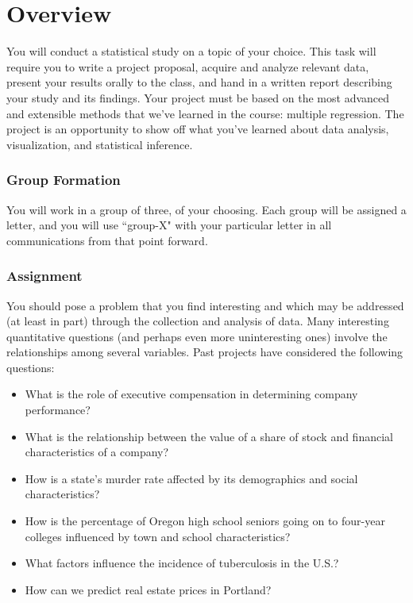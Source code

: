 \documentclass[10pt]{article}
\begin{document}

\section{Overview} 
You will conduct a statistical study on a topic of your choice. This task will require you to write a project proposal, acquire and analyze relevant data, present your results orally to the class, and hand in a written report describing your study and its findings. Your project must be based on the most advanced and extensible methods that we've learned in the course: multiple regression. The project is an opportunity to show off what you've learned about data analysis, visualization, and statistical inference.

\subsubsection*{Group Formation}
You will work in a group of three, of your choosing. Each group will be assigned a letter, and you will use ``group-X" with your particular letter in all communications from that point forward.

\subsubsection*{Assignment}
You should pose a problem that you find interesting and which may be addressed (at least in part) through the collection and analysis of data. Many interesting quantitative questions (and perhaps even more uninteresting ones) involve the relationships among several variables. Past projects have considered the following questions:

\begin{itemize}
	\item What is the role of executive compensation in determining company performance?
	\item What is the relationship between the value of a share of stock and financial characteristics of a company?
	\item How is a state's murder rate affected by its demographics and social characteristics?
	\item How is the percentage of Oregon high school seniors going on to four-year colleges influenced by town and school characteristics?
	\item What factors influence the incidence of tuberculosis in the U.S.?
	\item How can we predict real estate prices in Portland?
\end{itemize}
\end{document}

